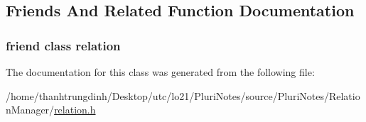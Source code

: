 \subsection{Friends And Related Function Documentation}
\subsubsection[{\texorpdfstring{relation}{relation}}]{\setlength{\rightskip}{0pt plus 5cm}friend class {\bf relation}\hspace{0.3cm}{\ttfamily [friend]}}\hypertarget{classrelation_1_1Const__Iterator_abf93246f9fba84b81cde8501c84c3fa2}{}\label{classrelation_1_1Const__Iterator_abf93246f9fba84b81cde8501c84c3fa2}


The documentation for this class was generated from the following file\+:\begin{DoxyCompactItemize}
\item 
/home/thanhtrungdinh/\+Desktop/utc/lo21/\+Pluri\+Notes/source/\+Pluri\+Notes/\+Relation\+Manager/\hyperlink{relation_8h}{relation.\+h}\end{DoxyCompactItemize}
